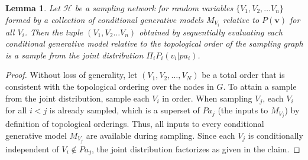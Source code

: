 \documentclass{article}
\newcommand{\h}{\mathcal{H}}
\newcommand{\vb}{\mathbf{v}}
\theoremstyle{plain}
\newtheorem{lemma}[theorem]{Lemma}
\theoremstyle{definition}
\theoremstyle{remark}
\begin{document}
\begin{lemma}
\label{lemma:joint-sample-from-net}
	Let $\h$ be a sampling network for random variables $\{V_1, V_2,\hdots V_n\}$ formed by a collection of conditional generative models $M_{V_i}$ relative to $P(\vb)$ for all $V_i$. Then the tuple $(V_1, V_2\hdots V_n)$ obtained by sequentially evaluating each conditional generative model relative to the topological order of the sampling graph is a sample from the joint distribution $\Pi_i P_i(v_i|pa_i)$.
\end{lemma}
\begin{proof}
	Without loss of generality, let $(V_1, V_2, \dots, V_N)$ be a total order that is consistent with the topological ordering over the nodes in $G$. To attain a sample from the joint distribution, sample each $V_i$ in order. When sampling $V_j$, each $V_i$ for all $i < j$ is already sampled, which is a superset of $Pa_j$ (the inputs to $M_{V_j}$) by definition of topological orderings. Thus, all inputs to every conditional generative model $M_{V_j}$ are available during sampling.  Since each $V_j$ is conditionally independent of $V_i\not \in Pa_j$, the joint distribution factorizes as given in the claim.
\end{proof}
\end{document}
